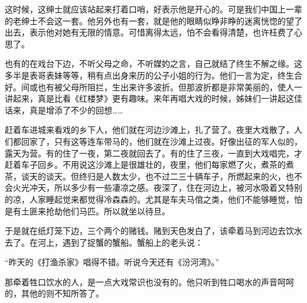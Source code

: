 \par 这时候，这绅士就应该站起来打着口哨，好表示他是开心的。可是我们中国上一辈的老绅士不会这一套。他另外也有一套，就是他的眼睛似睁非睁的迷离恍惚的望了出去，表示他对她有无限的情意。可惜离得太远，怕不会看得清楚，也许枉费了心思了。
\par 也有的在戏台下边，不听父母之命，不听媒妁之言，自己就结了终生不解之缘。这多半是表哥表妹等等，稍有点出身来历的公子小姐的行为。他们一言为定，终生合好。间或也有被父母所阻拦，生出来许多波折。但那波折都是非常美丽的，使人一讲起来，真是比看《红楼梦》更有趣味。来年再唱大戏的时候，姊妹们一讲起这佳话来，真是增添了不少的回想……
\par 赶着车进城来看戏的乡下人，他们就在河边沙滩上，扎了营了。夜里大戏散了，人们都回家了，只有这等连车带马的，他们就在沙滩上过夜。好像出征的军人似的，露天为营。有的住了一夜，第二夜就回去了。有的住了三夜，一直到大戏唱完，才赶着车子回乡。不用说这沙滩上是很雄壮的，夜里，他们每家燃了火，煮茶的煮茶，谈天的谈天。但终归是人数太少，也不过二三十辆车子，所燃起来的火，也不会火光冲天，所以多少有一些凄凉之感。夜深了，住在河边上，被河水吸着又特别的凉，人家睡起觉来都觉得冷森森的。尤其是车夫马倌之类，他们不能够睡觉，怕是有土匪来抢劫他们马匹。所以就坐以待旦。
\par 于是就在纸灯笼下边，三个两个的赌钱。赌到天色发白了，该牵着马到河边去饮水去了。在河上，遇到了捉蟹的蟹船。蟹船上的老头说：
\par “昨天的《打渔杀家》唱得不错。听说今天还有《汾河湾》。”
\par 那牵着牲口饮水的人，是一点大戏常识也没有的。他只听到牲口喝水的声音呵呵的，其他的则不知所答了。
